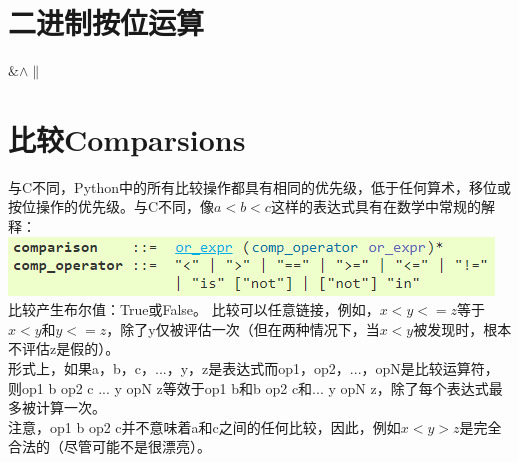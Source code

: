 \documentclass[10pt,UTF8]{ctexart}
\begin{document}
\section{二进制按位运算}
$ \& \wedge \| $
\section{比较Comparsions}
与C不同，Python中的所有比较操作都具有相同的优先级，低于任何算术，移位或按位操作的优先级。与C不同，像$a <b <c$这样的表达式具有在数学中常规的解释：\\
\includegraphics[scale=0.95]{comparsions.jpg} 
\indent 比较产生布尔值：True或False。
\indent 比较可以任意链接，例如，$x <y <= z$等于$x <y$和$y <= z$，除了y仅被评估一次（但在两种情况下，当$x <y$被发现时，根本不评估z是假的）。\\
\indent 形式上，如果a，b，c，...，y，z是表达式而op1，op2，...，opN是比较运算符，则op1 b op2 c ... y opN z等效于op1 b和b op2 c和... y opN z，除了每个表达式最多被计算一次。\\
\indent 注意，op1 b op2 c并不意味着a和c之间的任何比较，因此，例如$x <y> z$是完全合法的（尽管可能不是很漂亮）。
\end{document}

